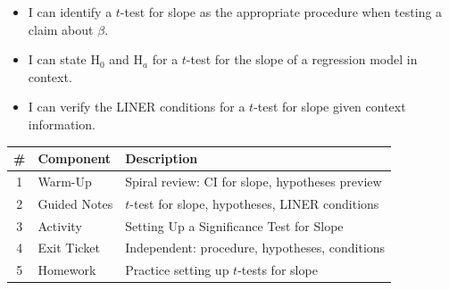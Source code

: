 \documentclass[10pt]{article}
\begin{document}

\vspace{2.4cm}
\namedateperiod

\begin{learningtargetbox}
\begin{itemize}
    \item I can identify a $t$-test for slope as the appropriate procedure when
          testing a claim about $\beta$.
    \item I can state H$_0$ and H$_a$ for a $t$-test for the slope of a regression
          model in context.
    \item I can verify the LINER conditions for a $t$-test for slope given context
          information.
\end{itemize}
\end{learningtargetbox}

\begin{tocbox}
\renewcommand{\arraystretch}{1.5}
\begin{tabularx}{\linewidth}{clX}
    \textbf{\#} & \textbf{Component} & \textbf{Description} \\
    \hline
    1 & Warm-Up      & Spiral review: CI for slope, hypotheses preview \\
    2 & Guided Notes & $t$-test for slope, hypotheses, LINER conditions \\
    3 & Activity     & Setting Up a Significance Test for Slope \\
    4 & Exit Ticket  & Independent: procedure, hypotheses, conditions \\
    5 & Homework     & Practice setting up $t$-tests for slope \\
\end{tabularx}
\end{tocbox}
\end{document}
